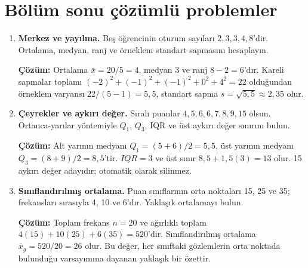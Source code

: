 \section{Bölüm sonu çözümlü problemler}

\begin{enumerate}
  \item \textbf{Merkez ve yayılma.} Beş öğrencinin oturum sayıları $2,3,3,4,8$'dir. Ortalama, medyan, ranj ve örneklem standart sapmasını hesaplayın.

  \textbf{Çözüm:} Ortalama $\bar{x}=20/5=4$, medyan 3 ve ranj $8-2=6$'dır. Kareli sapmalar toplamı $(-2)^2+(-1)^2+(-1)^2+0^2+4^2=22$ olduğundan örneklem varyansı $22/(5-1)=5{,}5$, standart sapma $s=\sqrt{5{,}5}\approx2{,}35$ olur.

  \item \textbf{Çeyrekler ve aykırı değer.} Sıralı puanlar $4,5,6,6,7,8,9,15$ olsun. Ortanca-yarılar yöntemiyle $Q_1$, $Q_3$, IQR ve üst aykırı değer sınırını bulun.

  \textbf{Çözüm:} Alt yarının medyanı $Q_1=(5+6)/2=5{,}5$, üst yarının medyanı $Q_3=(8+9)/2=8{,}5$'tir. $IQR=3$ ve üst sınır $8{,}5+1{,}5(3)=13$ olur. 15 aykırı değer adayıdır; otomatik olarak silinmez.

  \item \textbf{Sınıflandırılmış ortalama.} Puan sınıflarının orta noktaları 15, 25 ve 35; frekansları sırasıyla 4, 10 ve 6'dır. Yaklaşık ortalamayı bulun.

  \textbf{Çözüm:} Toplam frekans $n=20$ ve ağırlıklı toplam $4(15)+10(25)+6(35)=520$'dir. Sınıflandırılmış ortalama $\bar{x}_g=520/20=26$ olur. Bu değer, her sınıftaki gözlemlerin orta noktada bulunduğu varsayımına dayanan yaklaşık bir özettir.
\end{enumerate}